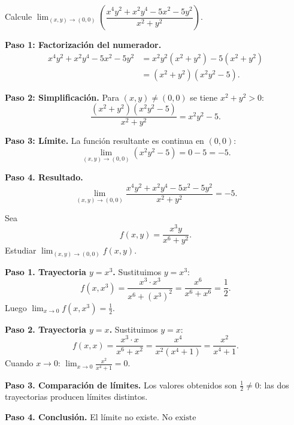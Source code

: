 \begin{prob}
Calcule $\displaystyle\lim_{(x,y)\to (0,0)}\left(\dfrac{x^4y^2+x^2y^4-5x^2-5y^2}{x^2+y^2}\right).$
\begin{myproof}
\textbf{Paso 1: Factorización del numerador.}
\begin{align*}
x^4y^2+x^2y^4-5x^2-5y^2
  &= x^2y^2\!\left(x^2+y^2\right)-5\!\left(x^2+y^2\right) \\
  &= \left(x^2+y^2\right)\!\left(x^2y^2-5\right).
\end{align*}

\textbf{Paso 2: Simplificación.} Para $(x,y)\neq(0,0)$ se tiene $x^2+y^2>0$:
\[
  \frac{\left(x^2+y^2\right)\!\left(x^2y^2-5\right)}{x^2+y^2} = x^2y^2-5.
\]

\textbf{Paso 3: Límite.} La función resultante es continua en $(0,0)$:
\[
  \lim_{(x,y)\to(0,0)}\!\left(x^2y^2-5\right) = 0-5 = -5.
\]

\textbf{Paso 4. Resultado.}
\[
  \boxed{\lim_{(x,y)\to (0,0)}\frac{x^4y^2+x^2y^4-5x^2-5y^2}{x^2+y^2} = -5.}
\]
\end{myproof}
\end{prob}

\begin{example}
Sea
\[
f(x,y) = \frac{x^3 y}{x^6 + y^2}.
\]
Estudiar $\lim_{(x,y)\to(0,0)} f(x,y)$.
\begin{myproof}
\textbf{Paso 1. Trayectoria $y=x^3$.} Sustituimos $y=x^3$:
\[
f(x,x^3) = \frac{x^3\cdot x^3}{x^6+(x^3)^2}
          = \frac{x^6}{x^6+x^6} = \frac{1}{2}.
\]
Luego $\lim_{x\to 0}f(x,x^3)=\tfrac{1}{2}$.

\textbf{Paso 2. Trayectoria $y=x$.} Sustituimos $y=x$:
\[
f(x,x) = \frac{x^3\cdot x}{x^6+x^2}
        = \frac{x^4}{x^2(x^4+1)} = \frac{x^2}{x^4+1}.
\]
Cuando $x\to 0$: $\displaystyle\lim_{x\to 0}\frac{x^2}{x^4+1} = 0$.

\textbf{Paso 3. Comparación de límites.} Los valores obtenidos son
$\tfrac{1}{2}\neq 0$: las dos trayectorias producen límites distintos.

\textbf{Paso 4. Conclusión.} El límite no existe.
$\boxed{\text{No existe}}$
\end{myproof}
\end{example}


